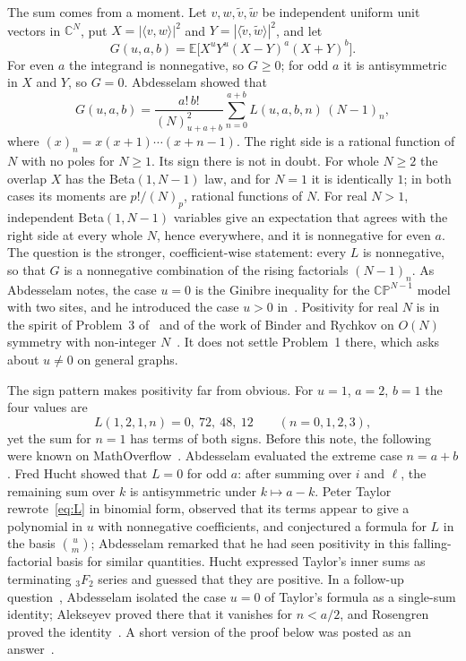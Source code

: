 \documentclass[11pt]{amsart}
\theoremstyle{remark}
\newcommand{\E}{\mathbb{E}}
\begin{document}
The sum comes from a moment. Let $v,w,\tilde v,\tilde w$ be independent uniform unit vectors in $\mathbb{C}^N$, put $X=|\langle v,w\rangle|^2$ and $Y=|\langle\tilde v,\tilde w\rangle|^2$, and let
\[
 G(u,a,b)=\E\bigl[X^uY^u(X-Y)^a(X+Y)^b\bigr].
\]
For even $a$ the integrand is nonnegative, so $G\ge0$; for odd $a$ it is antisymmetric in $X$ and $Y$, so $G=0$. Abdesselam showed that
\begin{equation}\label{eq:G}
 G(u,a,b)=\frac{a!\,b!}{(N)_{u+a+b}^2}\sum_{n=0}^{a+b}L(u,a,b,n)\,(N-1)_n,
\end{equation}
where $(x)_n=x(x+1)\cdots(x+n-1)$. The right side is a rational function of $N$ with no poles for $N\ge1$. Its sign there is not in doubt. For whole $N\ge2$ the overlap $X$ has the Beta$(1,N-1)$ law, and for $N=1$ it is identically $1$; in both cases its moments are $p!/(N)_p$, rational functions of $N$. For real $N>1$, independent Beta$(1,N-1)$ variables give an expectation that agrees with the right side at every whole $N$, hence everywhere, and it is nonnegative for even $a$. The question is the stronger, coefficient-wise statement: every $L$ is nonnegative, so that $G$ is a nonnegative combination of the rising factorials $(N-1)_n$. As Abdesselam notes, the case $u=0$ is the Ginibre inequality for the $\mathbb{CP}^{N-1}$ model with two sites, and he introduced the case $u>0$ in~\cite{Abd}. Positivity for real $N$ is in the spirit of Problem~3 of~\cite[Section~4]{Abd} and of the work of Binder and Rychkov on $O(N)$ symmetry with non-integer $N$~\cite{BR}. It does not settle Problem~1 there, which asks about $u\ne0$ on general graphs.

The sign pattern makes positivity far from obvious. For $u=1$, $a=2$, $b=1$ the four values are
\[
 L(1,2,1,n)=0,\ 72,\ 48,\ 12\qquad(n=0,1,2,3),
\]
yet the sum for $n=1$ has terms of both signs. Before this note, the following were known on MathOverflow~\cite{MO}. Abdesselam evaluated the extreme case $n=a+b$. Fred Hucht showed that $L=0$ for odd $a$: after summing over $i$ and $\ell$, the remaining sum over $k$ is antisymmetric under $k\mapsto a-k$. Peter Taylor rewrote~\eqref{eq:L} in binomial form, observed that its terms appear to give a polynomial in $u$ with nonnegative coefficients, and conjectured a formula for $L$ in the basis $\binom um$; Abdesselam remarked that he had seen positivity in this falling-factorial basis for similar quantities. Hucht expressed Taylor's inner sums as terminating ${}_3F_2$ series and guessed that they are positive. In a follow-up question~\cite{MO2}, Abdesselam isolated the case $u=0$ of Taylor's formula as a single-sum identity; Alekseyev proved there that it vanishes for $n<a/2$, and Rosengren proved the identity~\cite{MO2}. A short version of the proof below was posted as an answer~\cite{MOans}.
\end{document}
